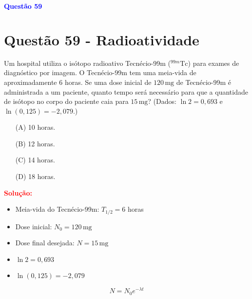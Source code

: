 \documentclass[a4paper,12pt]{article}
\begin{document}
\begin{flushleft}
\textbf{\textcolor{blue}{\Large Quest\~ao 59}}\\
\noindent
\section{Quest\~ao 59 - Radioatividade}
Um hospital utiliza o isótopo radioativo Tecnécio-99m (\(^{99m}\mathrm{Tc}\)) para exames de diagnóstico por imagem.  
O Tecnécio-99m tem uma meia-vida de aproximadamente \(6\) horas. Se uma dose inicial de \(120\,\mathrm{mg}\) de Tecnécio-99m é 
administrada a um paciente, quanto tempo será necessário para que a quantidade de isótopo no corpo do paciente caia para \(15\,\mathrm{mg}\)?
(Dados: \(\ln 2 = 0{,}693\) e \(\ln(0{,}125) = -2{,}079\).)

\begin{itemize}
\item[(A)] 10 horas.
\item[(B)] 12 horas.
\item[(C)] 14 horas.
\item[(D)] 18 horas.
\end{itemize}

\vspace{0.5cm}

\textcolor{red}{\textbf{Solução:}}\\


\begin{itemize}
    \item Meia-vida do Tecnécio-99m: \( T_{1/2} = 6 \) horas
    \item Dose inicial: \( N_0 = 120\,\mathrm{mg} \)
    \item Dose final desejada: \( N = 15\,\mathrm{mg} \)
    \item \(\ln 2 = 0{,}693\)
    \item \(\ln(0{,}125) = -2{,}079\)
\end{itemize}

\vspace{0.3cm}


\[
N = N_0 e^{-\lambda t}
\]


\vspace{0.3cm}



\end{flushleft}
\end{document}
